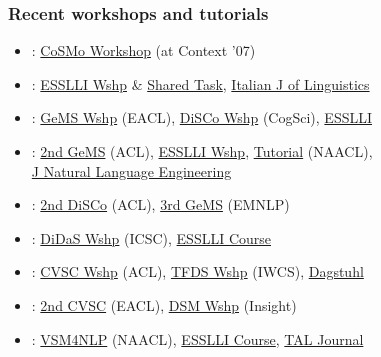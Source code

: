 \documentclass[t]{beamer} %
\begin{document}
\begin{frame}
  \frametitle{Recent workshops and tutorials}

  \ungap[1]
  \begin{itemize}
  \item {}: \href{http://clic.cimec.unitn.it/marco/beyond_words/}{CoSMo Workshop} (at Context '07)
  \item {}: \href{http://wordspace.collocations.de/doku.php/workshop:esslli:start}{ESSLLI Wshp} \& \href{http://wordspace.collocations.de/doku.php/workshop:esslli:task}{Shared Task}, \href{http://linguistica.sns.it/RdL/2008.html}{Italian J of Linguistics}
  \item {}: \href{http://art.uniroma2.it/gems/}{GeMS Wshp} (EACL), \href{http://www.let.rug.nl/disco2009/}{DiSCo Wshp} (CogSci), \href{http://wordspace.collocations.de/doku.php/course:esslli2009:start}{ESSLLI}
  \item {}: \href{http://art.uniroma2.it/gems010/}{2nd GeMS} (ACL), \href{http://clic.cimec.unitn.it/roberto/ESSLLI10-dsm-workshop/}{ESSLLI Wshp}, \href{http://naaclhlt2010.isi.edu/tutorials/t4.html}{Tutorial} (NAACL),\\
    \href{https://www.cambridge.org/core/journals/natural-language-engineering/issue/0C6E78AFDAB2AC263CDC331193B5E83A}{J Natural Language Engineering}
 \item {}: \href{https://www.aclweb.org/anthology/W/W11/\#1300}{2nd DiSCo} (ACL), \href{https://sites.google.com/site/geometricalmodels/}{3rd GeMS} (EMNLP)
  \item {}: \href{http://didas.org}{DiDaS Wshp} (ICSC), \href{https://www.cl.cam.ac.uk/~ah433/esslli2012/coursecontent.html}{ESSLLI Course}
  \item {}: \href{https://sites.google.com/site/cvscworkshop/}{CVSC Wshp} (ACL), \href{http://clic.cimec.unitn.it/roberto/IWCS-TFDS2013/}{TFDS Wshp} (IWCS), \href{http://www.dagstuhl.de/en/program/calendar/semhp/?semnr=13462}{Dagstuhl}
  \item {}: \href{https://sites.google.com/site/cvscworkshop2014/}{2nd CVSC} (EACL), \href{https://sites.google.com/site/insightdistsemws/}{DSM Wshp} (Insight)
  \item {}: \href{https://aclanthology.coli.uni-saarland.de/volumes/proceedings-of-the-1st-workshop-on-vector-space-modeling-for-natural-language-processing}{VSM4NLP} (NAACL), \href{https://staff.fnwi.uva.nl/w.zuidema/teaching/compositional-and-vectorial-semantics-esslli-2015/}{ESSLLI Course}, \href{https://hal.archives-ouvertes.fr/hal-01259695/}{TAL Journal}

\end{itemize}
\end{frame}
\end{document}
